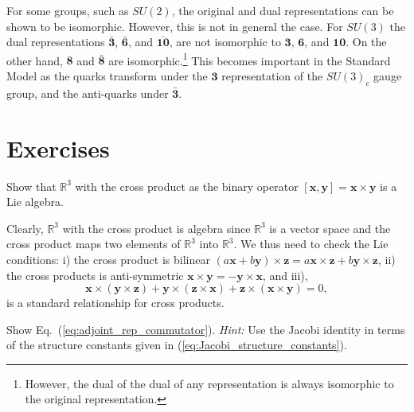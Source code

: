 \documentclass[notes.tex]{subfiles}
\begin{document}
For some groups, such as $SU(2)$, the original and dual representations can be shown to be isomorphic. However, this is not in general the case. For $SU(3)$ the dual representations $\mathbf {\bar 3}$, $\mathbf {\bar 6}$, and $\mathbf{\overline{10}}$, are not isomorphic to $\mathbf 3$, $\mathbf 6$, and $\mathbf{10}$. On the other hand, $\mathbf 8$ and $\mathbf {\bar 8}$ are isomorphic.\footnote{However, the dual of the dual of any representation is always isomorphic to the original representation.} This becomes important in the Standard Model as the quarks transform under the $\mathbf 3$ representation of the $SU(3)_c$ gauge group, and the anti-quarks under $\mathbf {\bar 3}$.



\section{Exercises}

\begin{Exercise}[difficulty=1]
Show that $\mathbb{R}^3$ with the cross product as the binary operator $[\mathbf x, \mathbf y]=\mathbf x \times \mathbf y$ is a Lie algebra.
\end{Exercise}
\begin{Answer}
Clearly,  $\mathbb{R}^3$ with the cross product is algebra since $\mathbb{R}^3$ is a vector space and the cross product maps two elements of $\mathbb{R}^3$ into $\mathbb{R}^3$. We thus need to check the Lie conditions: i) the cross product is bilinear $(a\mathbf x +b\mathbf y)\times \mathbf z = a\mathbf x\times\mathbf z + b\mathbf y\times \mathbf z$, ii) the cross products is anti-symmetric $\mathbf x \times \mathbf y=-\mathbf y \times \mathbf x$, and iii), 
\[
\mathbf x \times (\mathbf y \times \mathbf z ) + \mathbf y \times (\mathbf z \times \mathbf x )+ \mathbf z \times (\mathbf x \times \mathbf y ) = 0,
\] 
is a standard relationship for cross products.
\end{Answer}

\begin{Exercise}[difficulty=2]
Show Eq.~(\ref{eq:adjoint_rep_commutator}). {\it Hint:} Use the Jacobi identity in terms of the structure constants given in (\ref{eq:Jacobi_structure_constants}).
\end{Exercise}
\end{document}
